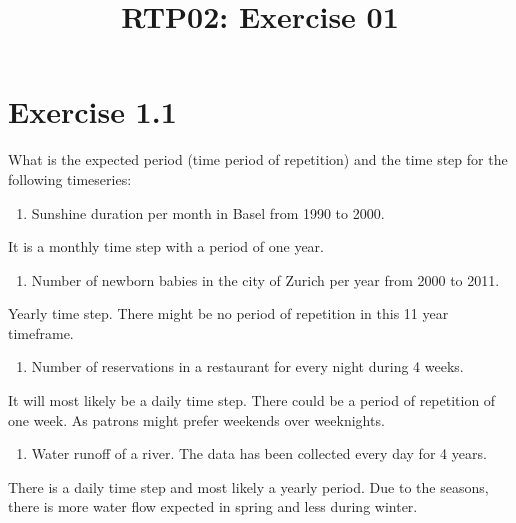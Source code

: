 \documentclass[11pt]{article}
\title{RTP02: Exercise 01}
\providecommand{\tightlist}{%
      \setlength{\itemsep}{0pt}\setlength{\parskip}{0pt}}
\begin{document}
    
    \maketitle
    
    

    
    \hypertarget{exercise-1.1}{%
\section{Exercise 1.1}\label{exercise-1.1}}

What is the expected period (time period of repetition) and the time
step for the following timeseries:

\begin{enumerate}
\def\labelenumi{\alph{enumi})}
\tightlist
\item
  Sunshine duration per month in Basel from 1990 to 2000.
\end{enumerate}

It is a monthly time step with a period of one year.

\begin{enumerate}
\def\labelenumi{\alph{enumi})}
\setcounter{enumi}{1}
\tightlist
\item
  Number of newborn babies in the city of Zurich per year from 2000 to
  2011.
\end{enumerate}

Yearly time step. There might be no period of repetition in this 11 year
timeframe.

\begin{enumerate}
\def\labelenumi{\alph{enumi})}
\setcounter{enumi}{2}
\tightlist
\item
  Number of reservations in a restaurant for every night during 4 weeks.
\end{enumerate}

It will most likely be a daily time step. There could be a period of
repetition of one week. As patrons might prefer weekends over
weeknights.

\begin{enumerate}
\def\labelenumi{\alph{enumi})}
\setcounter{enumi}{3}
\tightlist
\item
  Water runoff of a river. The data has been collected every day for 4
  years.
\end{enumerate}

There is a daily time step and most likely a yearly period. Due to the
seasons, there is more water flow expected in spring and less during
winter.
\end{document}
